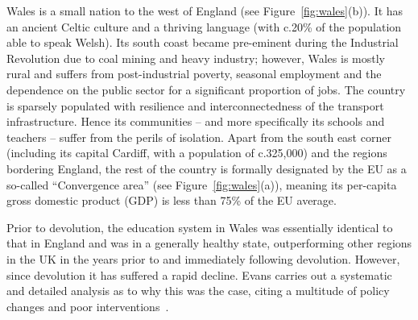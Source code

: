 \documentclass{sig-alternate}
\begin{document}

Wales is a small nation to the west of England (see
Figure~\ref{fig:wales}(b)).  It has an ancient Celtic culture and a
thriving language (with c.20\% of the population able to speak Welsh).
Its south coast became pre-eminent during the Industrial Revolution
due to coal mining and heavy industry; however, Wales is mostly rural
and suffers from post-industrial poverty, seasonal employment and the
dependence on the public sector for a significant proportion of
jobs. The country is sparsely populated with resilience and
interconnectedness of the transport infrastructure.  Hence its
communities -- and more specifically its schools and teachers --
suffer from the perils of isolation. Apart from the south east corner
(including its capital Cardiff, with a population of c.325,000) and
the regions bordering England, the rest of the country is formally
designated by the EU as a so-called ``Convergence area'' (see
Figure~\ref{fig:wales}(a)), meaning its per-capita gross domestic
product (GDP) is less than 75\% of the EU average.


Prior to devolution, the education system in Wales was essentially
identical to that in England and was in a generally healthy state,
outperforming other regions in the UK in the years prior to and
immediately following devolution.  However, since devolution it has
suffered a rapid decline.  Evans carries out a systematic and detailed
analysis as to why this was the case, citing a multitude of policy
changes and poor interventions~\cite{Evans:2015}.
\end{document}
